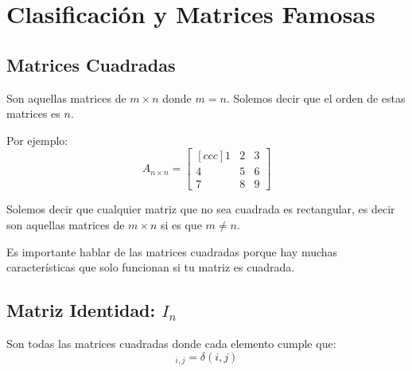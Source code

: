 \documentclass[12pt, fleqn]{report}                             %
\theoremstyle{break}                                            %
\begin{document}
        \clearpage
        \section{Clasificación y Matrices Famosas}

            \subsection{Matrices Cuadradas}

                Son aquellas matrices de $m \times n$ donde $m = n$.
                Solemos decir que el orden de estas matrices es $n$.

                Por ejemplo: 
                \begin{equation*}
                    A_{n \times n} =
                    \begin{bmatrix}[ccc]
                        1 & 2 & 3 \\
                        4 & 5 & 6 \\
                        7 & 8 & 9
                    \end{bmatrix}
                \end{equation*}

                Solemos decir que cualquier matriz que no sea cuadrada es
                rectangular, es decir son aquellas matrices de $m \times n$
                si es que $m \neq n$.

                Es importante hablar de las matrices cuadradas porque hay muchas
                características que solo funcionan si tu matriz es cuadrada.



            \clearpage
            \subsection{Matriz Identidad: $I_n$}

                Son todas las matrices cuadradas donde cada elemento cumple que:
                \begin{equation*}
                    [I]_{i, j} = \delta(i, j)
                \end{equation*}
\end{document}
